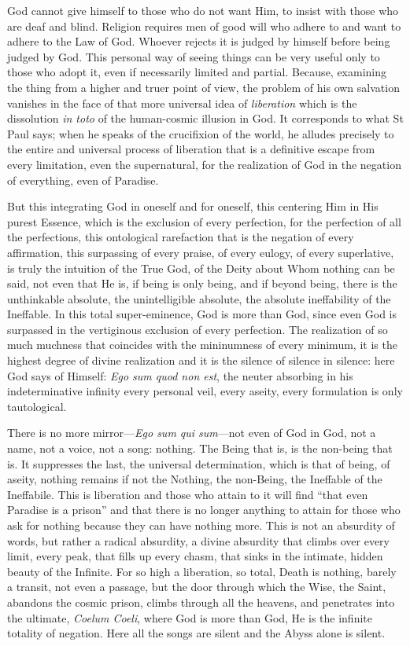 God cannot give himself to those who do not want Him, to insist with those who are deaf and blind. Religion requires men of good will who adhere to and want to adhere to the Law of God. Whoever rejects it is judged by himself before being judged by God. This personal way of seeing things can be very useful only to those who adopt it, even if necessarily limited and partial. Because, examining the thing from a higher and truer point of view, the problem of his own salvation vanishes in the face of that more universal idea of \emph{liberation} which is the dissolution \emph{in toto} of the human-cosmic illusion in God. It corresponds to what St Paul says; when he speaks of the crucifixion of the world, he alludes precisely to the entire and universal process of liberation that is a definitive escape from every limitation, even the supernatural, for the realization of God in the negation of everything, even of Paradise.

But this integrating God in oneself and for oneself, this centering Him in His purest Essence, which is the exclusion of every perfection, for the perfection of all the perfections, this ontological rarefaction that is the negation of every affirmation, this surpassing of every praise, of every eulogy, of every superlative, is truly the intuition of the True God, of the Deity about Whom nothing can be said, not even that He is, if being is only being, and if beyond being, there is the unthinkable absolute, the unintelligible absolute, the absolute ineffability of the Ineffable. In this total super-eminence, God is more than God, since even God is surpassed in the vertiginous exclusion of every perfection. The realization of so much muchness that coincides with the mininumness of every minimum, it is the highest degree of divine realization and it is the silence of silence in silence: here God says of Himself: \emph{Ego sum quod non est}, the neuter absorbing in his indeterminative infinity every personal veil, every aseity, every formulation is only tautological.

There is no more mirror---\emph{Ego sum qui sum}---not even of God in God, not a name, not a voice, not a song: nothing. The Being that is, is the non-being that is. It suppresses the last, the universal determination, which is that of being, of aseity, nothing remains if not the Nothing, the non-Being, the Ineffable of the Ineffabile. This is liberation and those who attain to it will find ``that even Paradise is a prison'' and that there is no longer anything to attain for those who ask for nothing because they can have nothing more. This is not an absurdity of words, but rather a radical absurdity, a divine absurdity that climbs over every limit, every peak, that fills up every chasm, that sinks in the intimate, hidden beauty of the Infinite. For so high a liberation, so total, Death is nothing, barely a transit, not even a passage, but the door through which the Wise, the Saint, abandons the cosmic prison, climbs through all the heavens, and penetrates into the ultimate, \emph{Coelum Coeli}, where God is more than God, He is the infinite totality of negation. Here all the songs are silent and the Abyss alone is silent.

